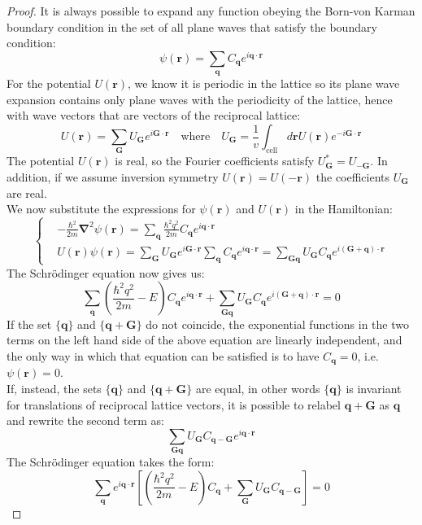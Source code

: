 \documentclass[10.75pt,a4paper,openright,bottom=2cm]{article}
\renewcommand{\Vec}[1]{\boldsymbol{#1}}
\begin{document}
\begin{proof}
It is always possible to expand any function obeying the Born-von Karman boundary condition in the set of all plane waves that satisfy the boundary condition:
\[
\psi(\Vec{r})=\sum_{\Vec{q}}C_{\Vec{q}}e^{i\Vec{q}\cdot\Vec{r}}
\]
For the potential $U(\Vec{r})$, we know it is periodic in the lattice so its plane wave expansion contains only plane waves with the periodicity of the lattice, hence with wave vectors that are vectors of the reciprocal lattice:
\[
U(\Vec{r})=\sum_{\Vec{G}}U_{\Vec{G}}e^{i\Vec{G}\cdot\Vec{r}} \quad \text{where} \quad U_{\Vec{G}}=\frac{1}{v}\int_{\text{cell}}d\Vec{r}U(\Vec{r})e^{-i\Vec{G}\cdot\Vec{r}}
\]
The potential $U(\Vec{r})$ is real, so the Fourier coefficients satisfy $U_{\Vec{G}}^*=U_{-\Vec{G}}$. In addition, if we assume inversion symmetry $U(\Vec{r})=U(-\Vec{r})$ the coefficients $U_{\Vec{G}}$ are real.\\
We now substitute the expressions for $\psi(\Vec{r})$ and $U(\Vec{r})$ in the Hamiltonian:
\[
\left\{
\begin{aligned}
&-\frac{\hbar^2}{2m}\Vec{\nabla}^2\psi(\Vec{r})=\sum_{\Vec{q}}\frac{\hbar^2q^2}{2m}C_{\Vec{q}}e^{i\Vec{q}\cdot\Vec{r}}\\
&U(\Vec{r})\psi(\Vec{r})=\sum_{\Vec{G}}U_{\Vec{G}}e^{i\Vec{G}\cdot\Vec{r}}\sum_{\Vec{q}}C_{\Vec{q}}e^{i\Vec{q}\cdot\Vec{r}}=\sum_{\Vec{G}\Vec{q}}U_{\Vec{G}}C_{\Vec{q}}e^{i(\Vec{G}+\Vec{q})\cdot\Vec{r}}
\end{aligned}
\right.
\]
The Schr\"odinger equation now gives us:
\[
\sum_{\Vec{q}}\left(\frac{\hbar^2q^2}{2m}-E\right)C_{\Vec{q}}e^{i\Vec{q}\cdot\Vec{r}}+\sum_{\Vec{G}\Vec{q}}U_{\Vec{G}}C_{\Vec{q}}e^{i(\Vec{G}+\Vec{q})\cdot\Vec{r}}=0
\]
If the set $\{\Vec{q}\}$ and $\{\Vec{q}+\Vec{G}\}$ do not coincide, the exponential functions in the two terms on the left hand side of the above equation are linearly independent, and the only way in which that equation can be satisfied is to have $C_{\Vec{q}}=0$, i.e. $\psi(\Vec{r})=0$.\\
If, instead, the sets $\{\Vec{q}\}$ and $\{\Vec{q}+\Vec{G}\}$ are equal, in other words $\{\Vec{q}\}$ is invariant for translations of reciprocal lattice vectors, it is possible to relabel $\Vec{q}+\Vec{G}$ as $\Vec{q}$ and rewrite the second term as:
\[
\sum_{\Vec{G}\Vec{q}}U_{\Vec{G}}C_{\Vec{q}-\Vec{G}}e^{i\Vec{q}\cdot\Vec{r}}
\]
The Schr\"odinger equation takes the form:
\[
\sum_{\Vec{q}}e^{i\Vec{q}\cdot\Vec{r}}\left[\left(\frac{\hbar^2q^2}{2m}-E\right)C_{\Vec{q}}+\sum_{\Vec{G}}U_{\Vec{G}}C_{\Vec{q}-\Vec{G}}\right]=0
\]
\end{proof}
\end{document}
